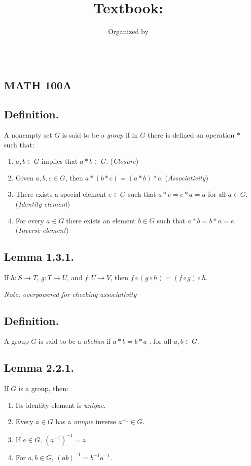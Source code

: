 \documentclass{article}
\title{
    \vspace{2in}
    \textsc{\Large\hmwkInstitution} \\
    \vspace{0.2in}
    \textmd{\textbf{\hmwkTitle}}\\
    \vspace{0.2in}\large{Textbook: \textit{\hmwkTextbook}}
}
\author{
  Organized by \hmwkAuthorName
}
\date{}
\newenvironment{lemma}[1]{\subsection*{Lemma #1.}}{}
\newenvironment{defn}{\subsection*{Definition.}}{}
\begin{document}
\maketitle

\thispagestyle{empty}
\clearpage
{} 

\pagebreak


\begin{center}
    \section*{\\ MATH 100A}
\end{center}

\vspace{0.2in}

\begin{defn}
    A nonempty set $G$ is said to be a \textit{group} if in $G$ there is defined an
    operation $*$ such that:
    \begin{enumerate}[label=(\alph*)]
        \item $a, b \in G$ implies that $a * b \in G$. (\textit{Closure})
        \item Given $a, b ,c \in G$, then $a * (b * c) = (a * b) * c$. (\textit{Associativity})
        \item There exists a special element $e \in G$ such that $a * e = e * a = a$ for all $a \in G$. (\textit{Identity element})
        \item For every $a \in G$ there exists an element $b \in G$ such that $a * b = b * a = e$. (\textit{Inverse element})
    \end{enumerate}
\end{defn}

\begin{lemma}{1.3.1}
    If $h: S \rightarrow T$, $g: T \rightarrow U$, and $f: U \rightarrow V$, then $f \circ (g \circ h) = (f \circ g) \circ h$.
    
    \textit{Note: overpowered for checking associativity}
\end{lemma}

\begin{defn}
    A group $G$ is said to be a \textit{abelian} if $a * b = b * a$ , for all $a, b \in G$.
\end{defn}

\begin{lemma}{2.2.1}
    If $G$ is a group, then:
    \begin{enumerate}[label=(\alph*)]
        \item Its identity element is \textit{unique}.
        \item Every $a \in G$ has a \textit{unique} inverse $a^{-1} \in G$.
        \item If $a \in G$, $(a^{-1})^{-1} = a$.
        \item For $a, b \in G$, $(ab)^{-1} = b^{-1}a^{-1}$.
    \end{enumerate}
\end{lemma}
\end{document}
